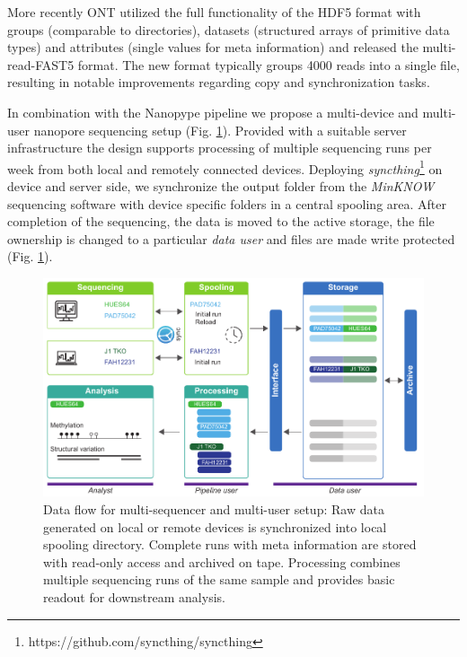 More recently ONT utilized the full functionality of the HDF5 format with groups (comparable to directories), datasets (structured arrays of primitive data types) and attributes (single values for meta information) and released the multi-read-FAST5 format. The new format typically groups 4000 reads into a single file, resulting in notable improvements regarding copy and synchronization tasks.

In combination with the Nanopype pipeline we propose a multi-device and multi-user nanopore sequencing setup (Fig. \ref{fig:nanopype:storage}). Provided with a suitable server infrastructure the design supports processing of multiple sequencing runs per week from both local and remotely connected devices. Deploying \textit{syncthing}\footnote{https://github.com/syncthing/syncthing} on device and server side, we synchronize the output folder from the \textit{MinKNOW} sequencing software with device specific folders in a central spooling area.
After completion of the sequencing, the data is moved to the active storage, the file ownership is changed to a particular \textit{data user} and files are made write protected (Fig. \ref{fig:nanopype:storage}).

\begin{figure}[h]
	\centering
	\includegraphics[width=1.0\textwidth]{figures/nanopype/storage.pdf}
	\captionsetup{format=plain}
	\caption[Nanopype data flow]{Data flow for multi-sequencer and multi-user setup: Raw data generated on local or remote devices is synchronized into local spooling directory. Complete runs with meta information are stored with read-only access and archived on tape. Processing combines multiple sequencing runs of the same sample and provides basic readout for downstream analysis.}
	\label{fig:nanopype:storage}
\end{figure}

